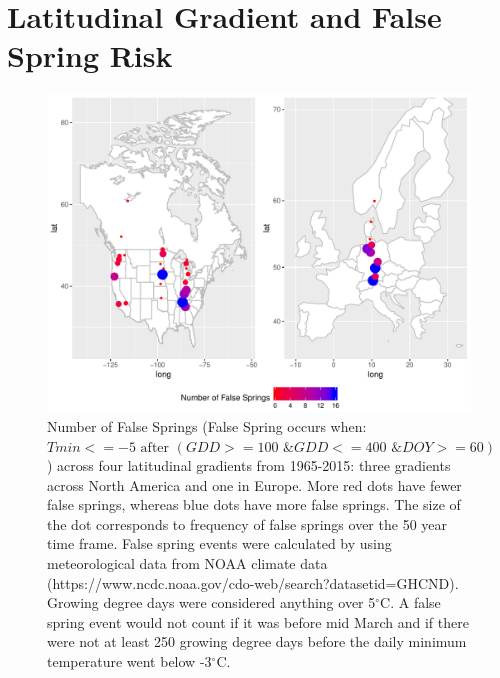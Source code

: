 \documentclass{article}\usepackage[]{graphicx}\usepackage[]{color}
\begin{document}
\renewcommand{\thetable}{\arabic{table}}
\renewcommand{\thefigure}{\arabic{figure}}
\renewcommand{\labelitemi}{$-$}

\section*{Latitudinal Gradient and False Spring Risk}

\begin{figure} [H]
\begin{center}
\caption{Number of False Springs (False Spring occurs when: \(Tmin <=-5 \text{ after } (GDD>=100 \text{ \& } GDD<=400 \text{ \& } DOY>=60) \)) across four latitudinal gradients from 1965-2015: three gradients across North America and one in Europe. More red dots have fewer false springs, whereas blue dots have more false springs. The size of the dot corresponds to frequency of false springs over the 50 year time frame. False spring events were calculated by using meteorological data from NOAA climate data (https://www.ncdc.noaa.gov/cdo-web/search?datasetid=GHCND). Growing degree days were considered anything over 5$^{\circ}$C. A false spring event would not count if it was before mid March \citep{Augspurger2013} and if there were not at least 250 growing degree days before the daily minimum temperature went below -3$^{\circ}$C.}
\includegraphics{..//figure/all_map.pdf} %
\end{center}
\end{figure}
\end{document}

